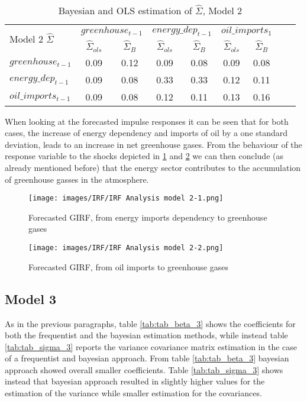 \documentclass[12pt]{article}
\begin{document}
\begin{table}[H]
\centering
\begin{tabular}{|l|c|c|c|c|c|c|c|c|}
  \hline
 \multirow{2}{*}{Model 2 $\hat{\Sigma}$} & \multicolumn{2}{c|}{$greenhouse_{t-1}$} & \multicolumn{2}{c|}{$energy\_dep_{t-1}$}  & \multicolumn{2}{c|}{$oil\_imports_{1}$} \\  \cline{2-7}
 & $\hat{\Sigma}_{ols}$ & $\hat{\Sigma}_{B}$ & $\hat{\Sigma}_{ols}$ & $\hat{\Sigma}_{B}$ & $\hat{\Sigma}_{ols}$ & $\hat{\Sigma}_{B}$ \\
  \hline
    $greenhouse_{t-1}$ & 0.09 & 0.12 & 0.09 & 0.08 & 0.09  &  0.08   \\ 
    $energy\_dep_{t-1}$ & 0.09 & 0.08 & 0.33 &  0.33 & 0.12 & 0.11 \\ 
    $oil\_imports_{t-1}$ & 0.09 & 0.08 & 0.12 & 0.11 & 0.13 & 0.16 \\ 
   \hline
\end{tabular}
\caption{Bayesian and OLS estimation of $\hat{\Sigma}$, Model 2} \label{tab:tab_sigma_2}
\end{table}

When looking at the forecasted impulse responses it can be seen that for both cases, the increase of energy dependency and imports of oil by a one standard deviation, leads to an increase in net greenhouse gases. From the behaviour of the response variable to the shocks depicted in \ref{fig:IRF2_1} and \ref{fig:IRF2_2} we can then conclude (as already mentioned before) that the energy sector contributes to the accumulation of greenhouse gasses in the atmosphere.

\begin{figure}[H]
    \centering
    \texttt{[image: images/IRF/IRF Analysis model 2-1.png]}
    \caption{Forecasted GIRF, from energy imports dependency to greenhouse gases}
    \label{fig:IRF2_1}
\end{figure}

 \begin{figure}[H]
    \centering
    \texttt{[image: images/IRF/IRF Analysis model 2-2.png]}
    \caption{Forecasted GIRF, from oil imports to greenhouse gases}
    \label{fig:IRF2_2}
\end{figure}



\subsection*{Model 3} \label{Results_model3}
As in the previous paragraphs, table \ref{tab:tab_beta_3} shows the coefficients for both the frequentist and the bayesian estimation methods, while instead table \ref{tab:tab_sigma_3} reports the variance covariance matrix estimation in the case of a frequentist and bayesian approach. From table \ref{tab:tab_beta_3} bayesian approach showed overall smaller coefficients. Table \ref{tab:tab_sigma_3} shows instead that bayesian approach resulted in slightly higher values for the estimation of the variance while smaller estimation for the covariances.
\end{document}
